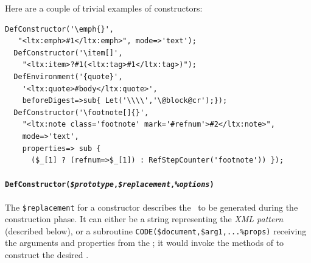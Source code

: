 \documentclass{book}
\newcommand{\ltxcode}{\lstinline[style=inlinelatexml]}
\begin{document}
Here are a couple of trivial examples of constructors:
\begin{lstlisting}[style=latexml]
  DefConstructor('\emph{}',
   "<ltx:emph>#1</ltx:emph>", mode=>'text');
  DefConstructor('\item[]',
    "<ltx:item>?#1(<ltx:tag>#1</ltx:tag>)");
  DefEnvironment('{quote}',   
    '<ltx:quote>#body</ltx:quote>',
    beforeDigest=>sub{ Let('\\\\','\@block@cr');});
  DefConstructor('\footnote[]{}',
    "<ltx:note class='footnote' mark='#refnum'>#2</ltx:note>",
    mode=>'text',
    properties=> sub { 
      ($_[1] ? (refnum=>$_[1]) : RefStepCounter('footnote')) });
\end{lstlisting}

\paragraph[DefConstructor]{%
   \texttt{DefConstructor(\textit{\$prototype},\textit{\$replacement},\textit{\%options})}}
The \ltxcode|$replacement| for a constructor describes the \XML\ to %
be generated during the construction phase. It can either be a string
representing the \emph{XML pattern} (described below), or a
subroutine \ltxcode|CODE($document,$arg1,...%
receiving the arguments and properties from the ;
it would invoke the methods of  to construct the desired \XML.
\end{document}
